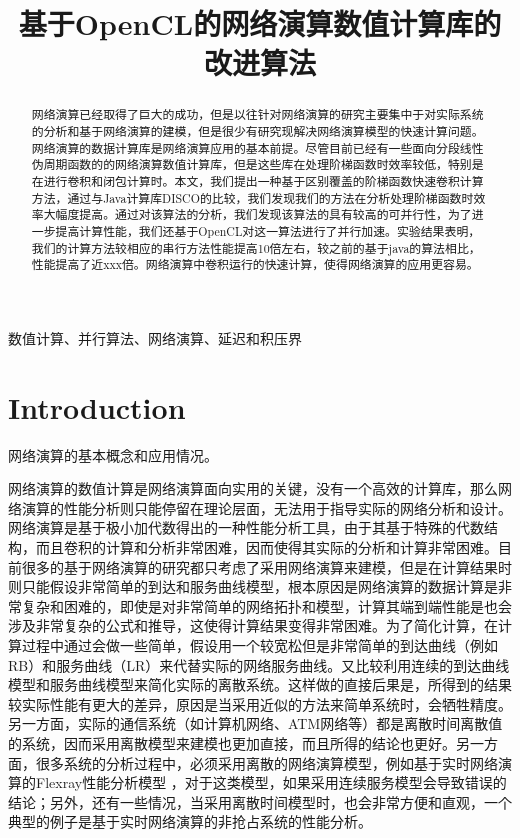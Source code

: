 \documentclass[10pt,journal]{IEEEtran}
\begin{document}
\title{基于OpenCL的网络演算数值计算库的改进算法}

\author{}
\maketitle

\begin{abstract}
网络演算已经取得了巨大的成功，但是以往针对网络演算的研究主要集中于对实际系统的分析和基于网络演算的建模，但是很少有研究现解决网络演算模型的快速计算问题。网络演算的数据计算库是网络演算应用的基本前提。尽管目前已经有一些面向分段线性伪周期函数的的网络演算数值计算库，但是这些库在处理阶梯函数时效率较低，特别是在进行卷积和闭包计算时。本文，我们提出一种基于区别覆盖的阶梯函数快速卷积计算方法，通过与Java计算库DISCO的比较，我们发现我们的方法在分析处理阶梯函数时效率大幅度提高。通过对该算法的分析，我们发现该算法的具有较高的可并行性，为了进一步提高计算性能，我们还基于OpenCL对这一算法进行了并行加速。实验结果表明，我们的计算方法较相应的串行方法性能提高10倍左右，较之前的基于java的算法相比，性能提高了近xxx倍。网络演算中卷积运行的快速计算，使得网络演算的应用更容易。
\end{abstract}
\begin{IEEEkeywords}
数值计算、并行算法、网络演算、延迟和积压界
\end{IEEEkeywords}

\section{Introduction}
网络演算的基本概念和应用情况。

网络演算的数值计算是网络演算面向实用的关键，没有一个高效的计算库，那么网络演算的性能分析则只能停留在理论层面，无法用于指导实际的网络分析和设计。网络演算是基于极小加代数得出的一种性能分析工具，由于其基于特殊的代数结构，而且卷积的计算和分析非常困难，因而使得其实际的分析和计算非常困难。目前很多的基于网络演算的研究都只考虑了采用网络演算来建模，但是在计算结果时则只能假设非常简单的到达和服务曲线模型，根本原因是网络演算的数据计算是非常复杂和困难的，即使是对非常简单的网络拓扑和模型，计算其端到端性能是也会涉及非常复杂的公式和推导，这使得计算结果变得非常困难。为了简化计算，在计算过程中通过会做一些简单，假设用一个较宽松但是非常简单的到达曲线（例如RB）和服务曲线（LR）来代替实际的网络服务曲线。又比较利用连续的到达曲线模型和服务曲线模型来简化实际的离散系统。这样做的直接后果是，所得到的结果较实际性能有更大的差异，原因是当采用近似的方法来简单系统时，会牺牲精度。另一方面，实际的通信系统（如计算机网络、ATM网络等）都是离散时间离散值的系统，因而采用离散模型来建模也更加直接，而且所得的结论也更好。另一方面，很多系统的分析过程中，必须采用离散的网络演算模型，例如基于实时网络演算的Flexray性能分析模型
\cite{Chokshi:2010:PAF:1774088.1774162,Hagiescu:2007:PAF:1278480.1278554}，对于这类模型，如果采用连续服务模型会导致错误的结论；另外，还有一些情况，当采用离散时间模型时，也会非常方便和直观，一个典型的例子是基于实时网络演算的非抢占系统的性能分析\cite{4617308}。
\end{document}
